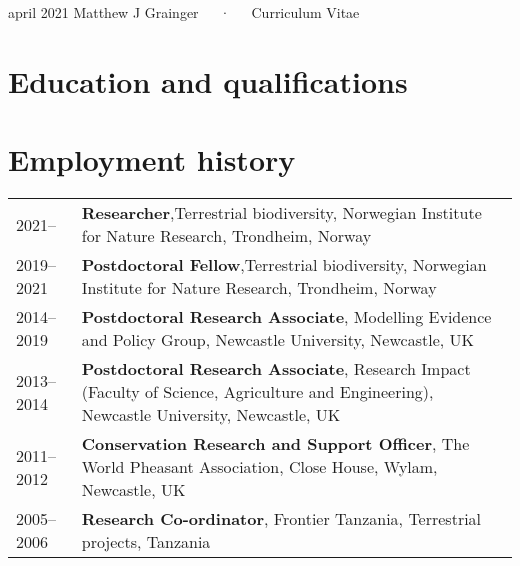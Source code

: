 \documentclass[11pt, a4paper]{awesome-cv}
\begin{document}
\makecvheader

\makecvfooter
  {april 2021}
    {Matthew J Grainger~~~·~~~Curriculum Vitae}
  {\thepage}





\hypertarget{education-and-qualifications}{%
\section{Education and
qualifications}\label{education-and-qualifications}}

\begin{cventries}
    \vspace{-4.0mm}
    \vspace{-4.0mm}
    \vspace{-4.0mm}
\end{cventries}

\hypertarget{employment-history}{%
\section{Employment history}\label{employment-history}}

\begin{tabular}{ll}
  2021-- & \textbf{Researcher},Terrestrial biodiversity, Norwegian Institute for Nature Research, Trondheim, Norway \\ 
  2019--2021 & \textbf{Postdoctoral Fellow},Terrestrial biodiversity, Norwegian Institute for Nature Research, Trondheim, Norway \\ 
  2014--2019 & \textbf{Postdoctoral Research Associate}, Modelling Evidence and Policy Group, Newcastle University, Newcastle, UK \\ 
  2013--2014 & \textbf{Postdoctoral Research Associate}, Research Impact (Faculty of Science, Agriculture and Engineering), Newcastle University, Newcastle, UK \\ 
  2011--2012 & \textbf{Conservation Research and Support Officer}, The World Pheasant Association, Close House, Wylam, Newcastle, UK \\ 
  2005--2006 & \textbf{Research Co-ordinator}, Frontier Tanzania, Terrestrial projects, Tanzania \\ 
  \end{tabular}
\end{document}

